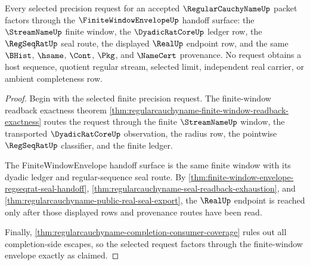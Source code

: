 \begin{theorem}
\label{thm:regularcauchyname-finitewindow-envelope-handoff}
Every selected precision request for an accepted $\RegularCauchyNameUp$ packet factors through the $\FiniteWindowEnvelopeUp$ handoff surface: the $\StreamNameUp$ finite window, the $\DyadicRatCoreUp$ ledger row, the $\RegSeqRatUp$ seal route, the displayed $\RealUp$ endpoint row, and the same $\BHist$, $\hsame$, $\Cont$, $\Pkg$, and $\NameCert$ provenance. No request obtains a host sequence, quotient regular stream, selected limit, independent real carrier, or ambient completeness row.
\end{theorem}
\begin{proof}
Begin with the selected finite precision request. The finite-window readback exactness theorem \autoref{thm:regularcauchyname-finite-window-readback-exactness} routes the request through the finite $\StreamNameUp$ window, the transported $\DyadicRatCoreUp$ observation, the radius row, the pointwise $\RegSeqRatUp$ classifier, and the finite ledger.

The FiniteWindowEnvelope handoff surface is the same finite window with its dyadic ledger and regular-sequence seal route. By \autoref{thm:finite-window-envelope-regseqrat-seal-handoff}, \autoref{thm:regularcauchyname-seal-readback-exhaustion}, and \autoref{thm:regularcauchyname-public-real-seal-export}, the $\RealUp$ endpoint is reached only after those displayed rows and provenance routes have been read.

Finally, \autoref{thm:regularcauchyname-completion-consumer-coverage} rules out all completion-side escapes, so the selected request factors through the finite-window envelope exactly as claimed.
\end{proof}

